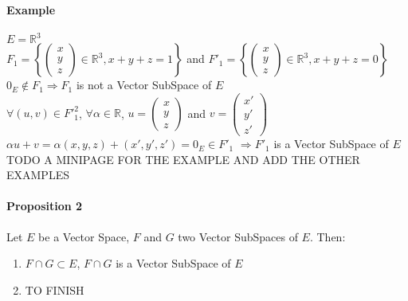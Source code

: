 \documentclass[notitlepage]{math}
\begin{document}
\paragraph{Example}
\noindent $E = \mathbb{R}^3$\\
$F_1 = \left\{\begin{pmatrix} x\\ y\\ z \end{pmatrix} \in \mathbb{R}^3, x + y + z = 1\right\}$ and $F'_1 = \left\{\begin{pmatrix} x\\ y\\ z \end{pmatrix} \in \mathbb{R}^3, x + y + z = 0\right\}$\\
$0_E \notin F_1 \Longrightarrow F_1$ is not a Vector SubSpace of $E$\\
$\forall (u, v) \in {F'}_1^2$, $\forall \alpha \in \mathbb{R}$, $u = \begin{pmatrix} x\\ y\\ z \end{pmatrix}$ and $v = \begin{pmatrix} x'\\ y'\\ z' \end{pmatrix}$\\
$\alpha u + v = \alpha(x, y, z) + (x', y', z') = 0_E \in F'_1$
$\Longrightarrow F'_1$ is a Vector SubSpace of $E$
{\color{blue}TODO A MINIPAGE FOR THE EXAMPLE AND ADD THE OTHER EXAMPLES}
\paragraph{Proposition 2}
Let $E$ be a Vector Space, $F$ and $G$ two Vector SubSpaces of $E$. Then:\\
\begin{enumerate}
    \item $F \cap G \subset E$,    $F \cap G$ is a Vector SubSpace of $E$
    \item {\color{blue}TO FINISH}
\end{enumerate} 
\end{document}
